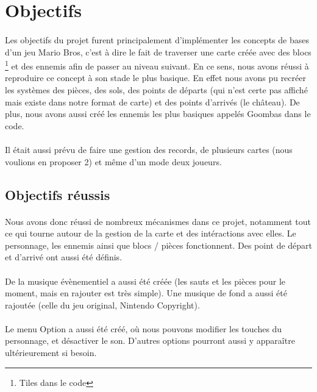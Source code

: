 ﻿\section{Objectifs}

\paragraph{} Les objectifs du projet furent principalement d'implémenter les concepts de bases d'un jeu Mario Bros, c'est à dire le fait de traverser une carte créée avec des blocs \footnote{Tiles dans le code} et des ennemis afin de passer au niveau suivant. En ce sens, nous avons réussi à reproduire ce concept à son stade le plus basique. En effet nous avons pu recréer les systèmes des pièces, des sols, des points de départs (qui n'est certe pas affiché mais existe dans notre format de carte) et des points d'arrivés (le château). De plus, nous avons aussi créé les ennemis les plus basiques appelés Goombas dans le code.

\paragraph{} Il était aussi prévu de faire une gestion des records, de plusieurs cartes (nous voulions en proposer 2) et même d'un mode deux joueurs.

\subsection{Objectifs réussis}

\paragraph{} Nous avons donc réussi de nombreux mécanismes dans ce projet, notamment tout ce qui tourne autour de la gestion de la carte et des intéractions avec elles. Le personnage, les ennemis ainsi que blocs / pièces fonctionnent. Des point de départ et d'arrivé ont aussi été définis.
\paragraph{} De la musique évènementiel a aussi été créée (les sauts et les pièces pour le moment, mais en rajouter est très simple). Une musique de fond a aussi été rajoutée (celle du jeu original, Nintendo Copyright).
\paragraph{} Le menu Option a aussi été créé, où nous pouvons modifier les touches du personnage, et désactiver le son. D'autres options pourront aussi y apparaître ultérieurement si besoin.

